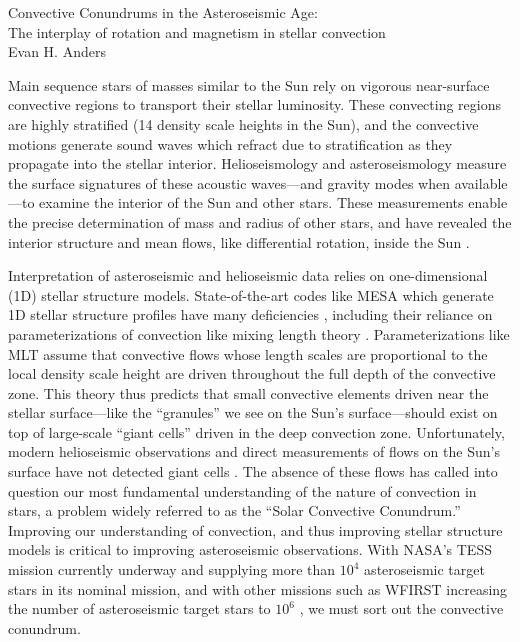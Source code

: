 \documentclass[preprint, hmargin=1in, vmargin=1in]{aastex62}
\begin{document}
\begin{center}
\Large{Convective Conundrums in the Asteroseismic Age:\\\vspace{-6pt}The interplay of rotation and magnetism in stellar convection} \\
\large{Evan H. Anders }
\end{center}
\vspace{-0.2cm}



Main sequence stars of masses similar to the Sun rely on vigorous near-surface convective regions to transport their stellar luminosity.
These convecting regions are highly stratified (14 density scale heights in the Sun), and the convective motions generate sound waves which refract due to stratification as they propagate into the stellar interior.
Helioseismology and asteroseismology measure the surface signatures of these acoustic waves---and gravity modes when available---to examine the interior of the Sun and other stars.
These measurements enable the precise determination of mass and radius of other stars, and have revealed the interior structure and mean flows, like differential rotation, inside the Sun \citep{huber&all2019, christensen-dalsgaard2002}.

Interpretation of asteroseismic and helioseismic data relies on one-dimensional (1D) stellar structure models. 
State-of-the-art codes like MESA \citep{paxton&all2011} which generate 1D stellar structure profiles have many deficiencies \citep{buldgen2019}, including their reliance on parameterizations of convection like mixing length theory \citep[MLT,][]{bohm-vitense1958}.
Parameterizations like MLT assume that convective flows whose length scales are proportional to the local density scale height are driven throughout the full depth of the convective zone.
This theory thus predicts that small convective elements driven near the stellar surface---like the ``granules'' we see on the Sun's surface---should exist on top of large-scale ``giant cells'' driven in the deep convection zone.
Unfortunately, modern helioseismic observations and direct measurements of flows on the Sun's surface have not detected giant cells \citep{hanasoge&all2015}.
The absence of these flows has called into question our most fundamental understanding of the nature of convection in stars, a problem widely referred to as the ``Solar Convective Conundrum.''
Improving our understanding of convection, and thus improving stellar structure models is critical to improving asteroseismic observations.
With NASA's TESS mission currently underway and supplying more than $10^4$ asteroseismic target stars in its nominal mission, and with other missions such as WFIRST increasing the number of asteroseismic target stars to $10^6$ \citep{huber&all2019}, we must sort out the convective conundrum.
\end{document}
